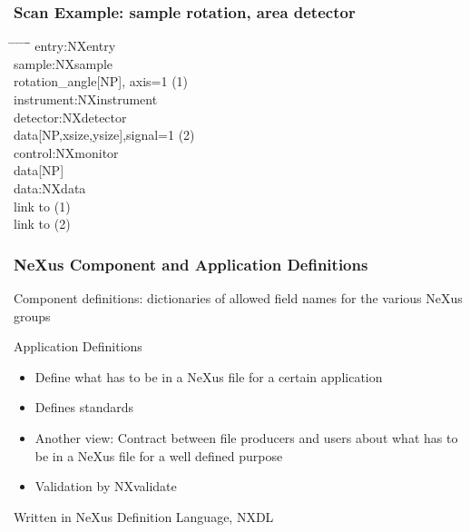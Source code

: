 \documentclass{beamer}
\newcommand{\changefont}[3] {
 \fontfamily{#1} \fontseries{#2} \fontshape{#3} \selectfont}
\begin{document}
\begin{frame}
\frametitle{Scan Example: sample rotation, area detector}
\begin{tabbing}
\hspace*{1cm} \= \hspace*{1cm} \= \hspace*{1cm} \= \hspace*{1cm} \= \hspace*{1cm} \= \hspace*{1cm}\= \kill
entry:NXentry \\
 \>sample:NXsample\\
 \> \> rotation\_angle[NP], axis=1 (1) \\
 \> instrument:NXinstrument\\
 \>  \>detector:NXdetector\\
 \>  \> \>data[NP,xsize,ysize],signal=1 (2)\\
 \>control:NXmonitor\\  
 \> \>data[NP]\\  
 \>data:NXdata\\
 \> \> link to (1)\\
 \> \> link to (2) \\
\end{tabbing}
\end{frame}




\begin{frame} \frametitle{NeXus Component and Application Definitions }
\begin{itemize}
\item Component definitions: 
 dictionaries of allowed field names for the various NeXus groups
{\changefont{cmr}{bx}{sc} 
\item Application Definitions
\begin{itemize}
\item Define what has to be in a NeXus file for a certain application
\item Defines standards
\item Another view: Contract between file producers and users about what has to be in 
 a NeXus file for a well defined purpose 
\item Validation by NXvalidate
\end{itemize}
}
\item Written in NeXus Definition Language, NXDL
\end{itemize}
\end{frame}
\end{document}
